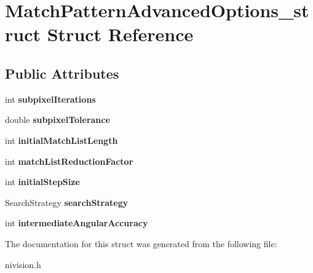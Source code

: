 \hypertarget{structMatchPatternAdvancedOptions__struct}{\section{\-Match\-Pattern\-Advanced\-Options\-\_\-struct \-Struct \-Reference}
\label{structMatchPatternAdvancedOptions__struct}
}
\subsection*{\-Public \-Attributes}
\begin{DoxyCompactItemize}
\item 
\hypertarget{structMatchPatternAdvancedOptions__struct_a820ddf92365b9647996ab75e2e20a4ad}{int {\bfseries subpixel\-Iterations}}\label{structMatchPatternAdvancedOptions__struct_a820ddf92365b9647996ab75e2e20a4ad}

\item 
\hypertarget{structMatchPatternAdvancedOptions__struct_a2768b4709bf23cc9b64a8c36b09f7e4b}{double {\bfseries subpixel\-Tolerance}}\label{structMatchPatternAdvancedOptions__struct_a2768b4709bf23cc9b64a8c36b09f7e4b}

\item 
\hypertarget{structMatchPatternAdvancedOptions__struct_a5e67431cbc4705ad7e8c7088f6c12286}{int {\bfseries initial\-Match\-List\-Length}}\label{structMatchPatternAdvancedOptions__struct_a5e67431cbc4705ad7e8c7088f6c12286}

\item 
\hypertarget{structMatchPatternAdvancedOptions__struct_a2a4992bcee08739ad5c591d7eda4b2b6}{int {\bfseries match\-List\-Reduction\-Factor}}\label{structMatchPatternAdvancedOptions__struct_a2a4992bcee08739ad5c591d7eda4b2b6}

\item 
\hypertarget{structMatchPatternAdvancedOptions__struct_ad850848fd4b69d0e013cd2e7f46c9e6f}{int {\bfseries initial\-Step\-Size}}\label{structMatchPatternAdvancedOptions__struct_ad850848fd4b69d0e013cd2e7f46c9e6f}

\item 
\hypertarget{structMatchPatternAdvancedOptions__struct_a472f4644ad1c1b4aca38b4ce3fbc217e}{\-Search\-Strategy {\bfseries search\-Strategy}}\label{structMatchPatternAdvancedOptions__struct_a472f4644ad1c1b4aca38b4ce3fbc217e}

\item 
\hypertarget{structMatchPatternAdvancedOptions__struct_ac38aded825e2a43c01ad72171311b652}{int {\bfseries intermediate\-Angular\-Accuracy}}\label{structMatchPatternAdvancedOptions__struct_ac38aded825e2a43c01ad72171311b652}

\end{DoxyCompactItemize}


\-The documentation for this struct was generated from the following file\-:\begin{DoxyCompactItemize}
\item 
nivision.\-h\end{DoxyCompactItemize}
